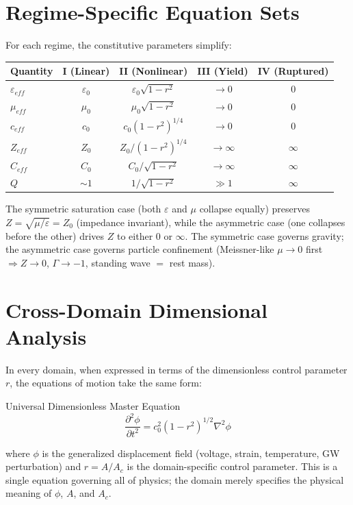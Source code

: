 \section{Regime-Specific Equation Sets}

For each regime, the constitutive parameters simplify:

\begin{center}
\begin{tabular}{|l|c|c|c|c|}
\hline
\textbf{Quantity} & \textbf{I (Linear)} & \textbf{II (Nonlinear)} & \textbf{III (Yield)} & \textbf{IV (Ruptured)} \\ \hline
$\varepsilon_{eff}$ & $\varepsilon_0$ & $\varepsilon_0 \sqrt{1-r^2}$ & $\to 0$ & 0 \\
$\mu_{eff}$         & $\mu_0$         & $\mu_0 \sqrt{1-r^2}$         & $\to 0$ & 0 \\
$c_{eff}$           & $c_0$           & $c_0(1-r^2)^{1/4}$          & $\to 0$ & 0 \\
$Z_{eff}$           & $Z_0$           & $Z_0 / (1-r^2)^{1/4}$       & $\to \infty$ & $\infty$ \\
$C_{eff}$           & $C_0$           & $C_0 / \sqrt{1-r^2}$        & $\to \infty$ & $\infty$ \\
$Q$                 & $\sim 1$        & $1/\sqrt{1-r^2}$             & $\gg 1$      & $\infty$ \\ \hline
\end{tabular}
\end{center}

\noindent The symmetric saturation case (both $\varepsilon$ and $\mu$ collapse equally) preserves $Z = \sqrt{\mu/\varepsilon} = Z_0$ (impedance invariant), while the asymmetric case (one collapses before the other) drives $Z$ to either 0 or $\infty$. The symmetric case governs gravity; the asymmetric case governs particle confinement (Meissner-like $\mu \to 0$ first $\Rightarrow Z \to 0$, $\Gamma \to -1$, standing wave $=$ rest mass).

\section{Cross-Domain Dimensional Analysis}
\label{sec:dimensional_analysis}

In every domain, when expressed in terms of the dimensionless control parameter $r$, the equations of motion take the same form:
\begin{resultbox}{Universal Dimensionless Master Equation}
\begin{equation}
    \frac{\partial^2 \phi}{\partial t^2} = c_0^2 (1-r^2)^{1/2} \nabla^2 \phi
\end{equation}
\end{resultbox}
where $\phi$ is the generalized displacement field (voltage, strain, temperature, GW perturbation) and $r = A/A_c$ is the domain-specific control parameter. This is a single equation governing all of physics; the domain merely specifies the physical meaning of $\phi$, $A$, and $A_c$.

